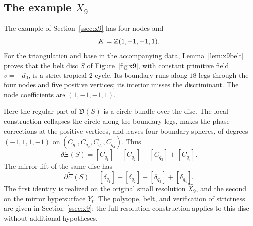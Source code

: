 \subsection{The example \texorpdfstring{$X_9$}{X9}}\label{ssec:res-x9}
The example of Section~\ref{ssec:x9} has four nodes and
\[
K=\mathbb Z(1,-1,-1,1).
\]
For the triangulation and base in the accompanying data, Lemma~\ref{lem:x9belt} proves that the belt disc $S$ of
Figure~\ref{fig:x9}, with constant primitive field $v=-d_0$, is a strict tropical $2$-cycle. Its boundary runs along
$18$ legs through the four nodes and five positive vertices; its interior misses the discriminant. The node
coefficients are $(1,-1,-1,1)$.

Here the regular part of $\mathfrak D(S)$ is a circle bundle over the disc. The local construction collapses the
circle along the boundary legs, makes the phase corrections at the positive vertices, and leaves four boundary
spheres, of degrees $(-1,1,1,-1)$ on $(C_{q_1},C_{q_2},C_{q_3},C_{q_4})$. Thus
\[
\partial\Xi(S)=[C_{q_1}]-[C_{q_2}]-[C_{q_3}]+[C_{q_4}].
\]
The mirror lift of the same disc has
\[
\partial\check\Xi(S)=[\delta_{q_1}]-[\delta_{q_2}]-[\delta_{q_3}]+[\delta_{q_4}].
\]
The first identity is realized on the original small resolution $\widehat X_9$, and the second on the mirror
hypersurface $Y_t$. The polytope, belt, and verification of strictness are given in Section~\ref{ssec:x9}; the full
resolution construction applies to this disc without additional hypotheses.
